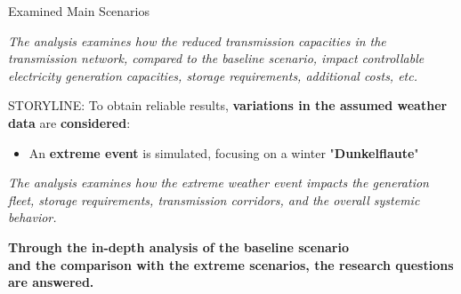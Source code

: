 \documentclass[aspectratio=169]{beamer}
\begin{document}
\begin{frame}{Examined Main Scenarios}
\begin{minipage}[t][12.9cm]{\textwidth}
\begin{minipage}[t]{0.325\textwidth}
\begin{coloredblock}
\begin{minipage}[t][2.5cm]{0.9\textwidth}
\begin{itemize}
                    \end{itemize}
                \end{minipage}
                \begin{minipage}[t][3.7cm]{0.9\textwidth} 
                    \scriptsize \textit{The analysis examines how the reduced transmission capacities in the transmission network, compared to the baseline scenario, impact controllable electricity generation capacities, storage requirements, additional costs, etc.}
                \end{minipage}
            \end{coloredblock}
        \end{minipage}
        \hfill
        \begin{minipage}[t]{0.325\textwidth}
            \begin{coloredblock}
                \begin{minipage}[t][3cm]{0.9\textwidth} 
                    \scriptsize STORYLINE: To obtain reliable results, \textbf{variations in the assumed weather data} are \textbf{considered}:
                \end{minipage}
                \begin{minipage}[t][2.5cm]{0.9\textwidth}
                    \begin{itemize}
                        \item \scriptsize An \textbf{extreme event} is simulated, focusing on a winter "\textbf{Dunkelflaute}"
                    \end{itemize}
                \end{minipage}
                \begin{minipage}[t][3.7cm]{0.9\textwidth} 
                    \scriptsize \textit{The analysis examines how the extreme weather event impacts the generation fleet, storage requirements, transmission corridors, and the overall systemic behavior.}
                \end{minipage}
            \end{coloredblock}
        \end{minipage}
        
    \end{minipage}

    \begin{coloredblock}[grey]
        \centering
        \footnotesize\textbf{Through the in-depth analysis of the baseline scenario \\
        and the comparison with the extreme scenarios, the research questions are answered.}
    \end{coloredblock}

\end{frame}
\end{document}
